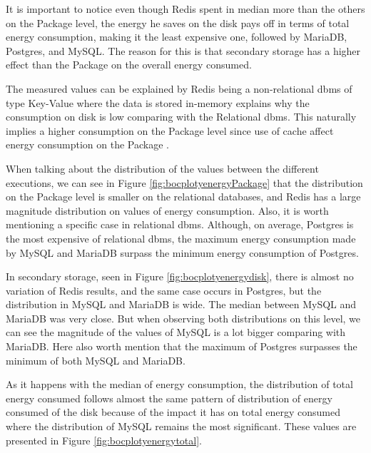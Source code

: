     It is important to notice even though Redis spent in median more than the others on the Package level, the energy he saves on the disk pays off in terms of total energy consumption, making it the least expensive one, followed by MariaDB, Postgres, and MySQL. The reason for this is that secondary storage has a higher effect than the Package on the overall energy consumed.


    The measured values can be explained by Redis being a non-relational \gls{dbms} of type Key-Value where the data is stored in-memory explains why the consumption on disk is low comparing with the Relational \gls{dbms}. This naturally implies a higher consumption on the Package level since use of cache affect energy consumption on the Package \cite{10.55552505464}.
    

\newpage


	
	When talking about the distribution of the values between the different executions, we can see in Figure \ref{fig:bocplotyenergyPackage} that the distribution on the Package level is smaller on the relational databases, and Redis has a large magnitude distribution on values of energy consumption.
    Also, it is worth mentioning a specific case in relational \gls{dbms}. Although, on average, Postgres is the most expensive of relational \gls{dbms}, the maximum energy consumption made by MySQL and MariaDB surpass the minimum energy consumption of Postgres.
	
	In secondary storage, seen in Figure \ref{fig:bocplotyenergydisk}, there is almost no variation of  Redis results, and the same case occurs in Postgres, but the distribution in MySQL and MariaDB is wide. The median between MySQL and MariaDB was very close. But when observing both distributions on this level, we can see the magnitude of the values of MySQL is a lot bigger comparing with MariaDB. Here also worth mention that the maximum of Postgres surpasses the minimum of both MySQL and MariaDB.


    As it happens with the median of energy consumption, the distribution of total energy consumed follows almost the same pattern of distribution of energy consumed of the disk because of the impact it has on total energy consumed where the distribution of MySQL remains the most significant. These values are presented in Figure  \ref{fig:bocplotyenergytotal}.
    

